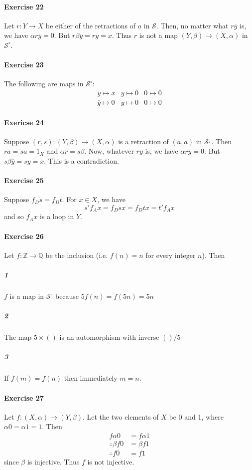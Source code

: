 \documentclass{report}
\begin{document}
    \paragraph{Exercise 22}
    Let $r : Y \rightarrow X$ be either of the retractions of $a$ in $\mathcal{S}$. Then, no matter what
    $r \overline{y}$ is, we have $\alpha r \overline{y} = 0$. But $r \beta \overline{y} = r y = x$.
    Thus $r$ is not a map $(Y, \beta) \rightarrow (X, \alpha)$ in $\mathcal{S}^\circ$.

    \paragraph{Exercise 23}
    The following are maps in $\mathcal{S}^\circ$:
    \begin{align*}
        \overline{y} \mapsto x & y \mapsto 0 & 0 \mapsto 0 \\
        \overline{y} \mapsto 0 & y \mapsto 0 & 0 \mapsto 0
    \end{align*}

    \paragraph{Exericse 24}
    Suppose $(r,s) : (Y, \beta) \rightarrow (X, \alpha)$ is a retraction of $(a,a)$ in
    $\mathcal{S}^\downarrow$. Then $ra = sa = 1_X$ and $\alpha r = s \beta$. Now, whatever $r \overline{y}$ is, we have
    $\alpha r \overline{y} = 0$. But $s \beta \overline{y} = s y = x$. This is a contradiction.

    \paragraph{Exercise 25}
    Suppose $f_D s = f_D t$. For $x \in X$, we have
    \[ s' f_A x = f_D s x = f_D t x = t' f_A x \]
    and so $f_A x$ is a loop in $Y$.

    \paragraph{Exercise 26}
    Let $f : \mathbb{Z} \rightarrow \mathbb{Q}$ be the inclusion (i.e. $f(n) = n$ for every integer $n$). Then
    \subparagraph{1}
    $f$ is a map in $\mathcal{S}^\circ$ because $5f(n) = f(5n) = 5n$
    \subparagraph{2}
    The map $5 \times ()$ is an automorphism with inverse $() / 5$
    \subparagraph{3}
    If $f(m) = f(n)$ then immediately $m = n$.

    \paragraph{Exercise 27}
    Let $f : (X, \alpha) \rightarrow (Y, \beta)$. Let the two elements of $X$ be 0 and 1, where $\alpha 0 =
    \alpha 1 = 1$. Then
    \begin{align*}
        f \alpha 0 & = f \alpha 1 \\
        \therefore \beta f 0 & = \beta f 1 \\
        \therefore f 0 & = f 1
    \end{align*}
    since $\beta$ is injective. Thus $f$ is not injective.
\end{document}

